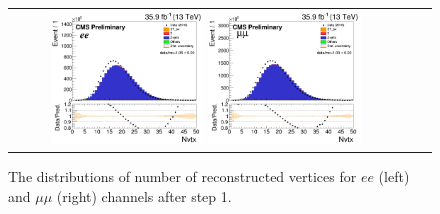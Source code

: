 \begin{figure}[ht]
  \begin{center}
    \begin{tabular}{ccc}
      \includegraphics[width=0.4\textwidth]{figures/tW/fig/Step1/ee_noNvtx/H_pv_n.png}
      \includegraphics[width=0.4\textwidth]{figures/tW/fig/Step1/mumu_noNvtx/H_pv_n.png}
    \end{tabular}
    \caption{The distributions of number of reconstructed vertices for $ee$ (left) and $\mu\mu$ (right) channels after step 1.
    \label{fig:step1_pv_n}}
  \end{center}
\end{figure}



